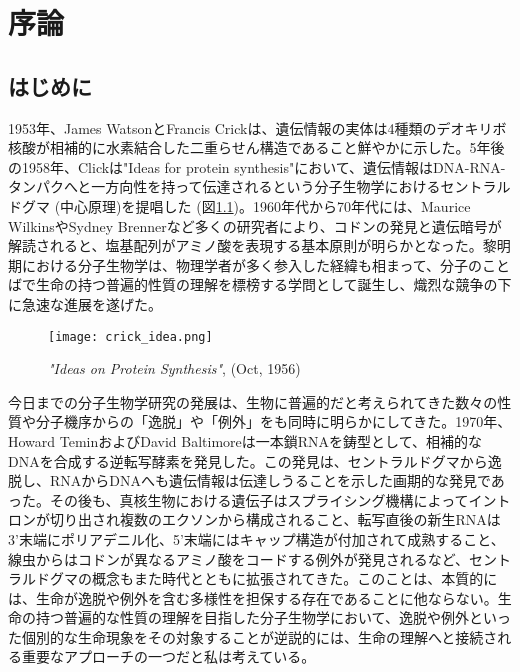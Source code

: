\chapter{序論}

\section{はじめに}
1953年、James WatsonとFrancis Crickは、遺伝情報の実体は4種類のデオキリボ核酸が相補的に水素結合した二重らせん構造であること鮮やかに示した。5年後の1958年、Clickは"Ideas for protein synthesis"において、遺伝情報はDNA-RNA-タンパクへと一方向性を持って伝達されるという分子生物学におけるセントラルドグマ (中心原理)を提唱した (図\ref{fig:crick_idea})。1960年代から70年代には、Maurice WilkinsやSydney Brennerなど多くの研究者により、コドンの発見と遺伝暗号が解読されると、塩基配列がアミノ酸を表現する基本原則が明らかとなった。黎明期における分子生物学は、物理学者が多く参入した経緯も相まって、分子のことばで生命の持つ普遍的性質の理解を標榜する学問として誕生し、熾烈な競争の下に急速な進展を遂げた。
\begin{figure}[htbp]
	\begin{center}
		\texttt{[image: crick\_idea.png]}
	\end{center}
	\caption{\textit{"Ideas on Protein Synthesis"}, (Oct, 1956)}
	\label{fig:crick_idea}
\end{figure}
\par
今日までの分子生物学研究の発展は、生物に普遍的だと考えられてきた数々の性質や分子機序からの「逸脱」や「例外」をも同時に明らかにしてきた。1970年、Howard TeminおよびDavid Baltimoreは一本鎖RNAを鋳型として、相補的なDNAを合成する逆転写酵素を発見した。この発見は、セントラルドグマから逸脱し、RNAからDNAへも遺伝情報は伝達しうることを示した画期的な発見であった。その後も、真核生物における遺伝子はスプライシング機構によってイントロンが切り出され複数のエクソンから構成されること、転写直後の新生RNAは3'末端にポリアデニル化、5'末端にはキャップ構造が付加されて成熟すること、線虫からはコドンが異なるアミノ酸をコードする例外が発見されるなど、セントラルドグマの概念もまた時代とともに拡張されてきた。このことは、本質的には、生命が逸脱や例外を含む多様性を担保する存在であることに他ならない。生命の持つ普遍的な性質の理解を目指した分子生物学において、逸脱や例外といった個別的な生命現象をその対象することが逆説的には、生命の理解へと接続される重要なアプローチの一つだと私は考えている。
